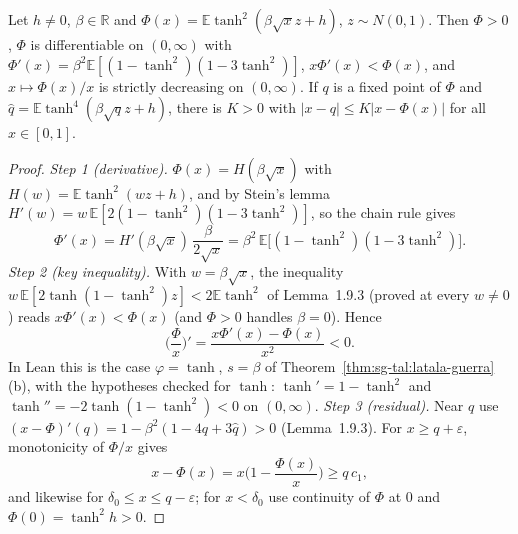 \begin{theorem}
\label{thm:sg-tal:residual}
  \leanok
{}
Let $h\ne0$, $\beta\in\mathbb R$ and $\Phi(x)=\mathbb E\tanh^2(\beta\sqrt xz+h)$, $z\sim N(0,1)$.  Then $\Phi>0$, $\Phi$ is differentiable on
$(0,\infty)$ with $\Phi'(x)=\beta^2\mathbb E[(1-\tanh^2)(1-3\tanh^2)]$, $x\Phi'(x)<\Phi(x)$, and $x\mapsto\Phi(x)/x$ is strictly decreasing
on $(0,\infty)$.  If $q$ is a fixed point of $\Phi$ and $\hat q=\mathbb E\tanh^4(\beta\sqrt qz+h)$, there is $K>0$ with $|x-q|\le K|x-\Phi(x)|$
for all $x\in[0,1]$.
\end{theorem}
\begin{proof}
  \leanok
\emph{Step 1 (derivative).} $\Phi(x)=H(\beta\sqrt x)$ with $H(w)=\mathbb E\tanh^2(wz+h)$, and by Stein's lemma $H'(w)=w\,\mathbb E[2(1-\tanh^2)(1-3\tanh^2)]$, so the chain rule gives
\[
\Phi'(x)=H'(\beta\sqrt x)\,\frac\beta{2\sqrt x}=\beta^2\,\mathbb E\big[(1-\tanh^2)(1-3\tanh^2)\big].
\]
\emph{Step 2 (key inequality).} With $w=\beta\sqrt x$, the inequality $w\,\mathbb E[2\tanh(1-\tanh^2)z]<2\mathbb E\tanh^2$ of Lemma~1.9.3 (proved at every $w\ne0$) reads $x\Phi'(x)<\Phi(x)$ (and $\Phi>0$ handles $\beta=0$). Hence
\[
\Big(\frac\Phi x\Big)'=\frac{x\Phi'(x)-\Phi(x)}{x^2}<0 .
\]
In Lean this is the case $\varphi=\tanh$, $s=\beta$ of Theorem~\ref{thm:sg-tal:latala-guerra}(b), with the hypotheses checked for $\tanh$: $\tanh'=1-\tanh^2$ and $\tanh''=-2\tanh(1-\tanh^2)<0$ on $(0,\infty)$.
\emph{Step 3 (residual).} Near $q$ use $(x-\Phi)'(q)=1-\beta^2(1-4q+3\hat q)>0$ (Lemma~1.9.3). For $x\ge q+\varepsilon$, monotonicity of $\Phi/x$ gives
\[
x-\Phi(x)=x\Big(1-\frac{\Phi(x)}x\Big)\ge q\,c_1 ,
\]
and likewise for $\delta_0\le x\le q-\varepsilon$; for $x<\delta_0$ use continuity of $\Phi$ at $0$ and $\Phi(0)=\tanh^2h>0$.
\end{proof}

